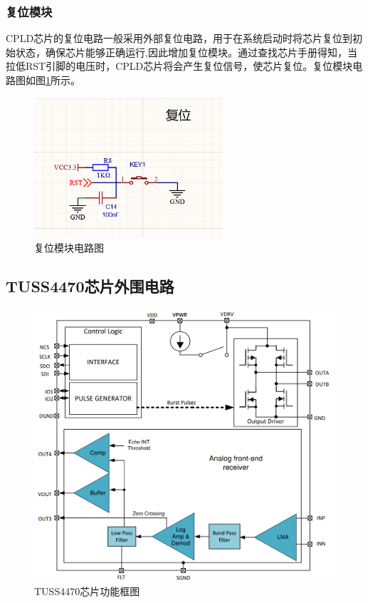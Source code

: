     \subsubsection{复位模块}
   CPLD芯片的复位电路一般采用外部复位电路，用于在系统启动时将芯片复位到初始状态，确保芯片能够正确运行,因此增加复位模块。通过查找芯片手册得知，当拉低RST引脚的电压时，CPLD芯片将会产生复位信号，使芯片复位。复位模块电路图如图\ref{复位模块电路图}所示。

    \begin{figure}[ht]
        \centering
        \includegraphics[width=7cm]{figure/reset circuit.png}
        \caption{复位模块电路图}
        \label{复位模块电路图}
    \end{figure}
    
    \newpage
    \subsection{TUSS4470芯片外围电路}
    
    
    \begin{figure}[ht]
		\centering
		\includegraphics[width=12cm]{figure/Function Block Diagram.png}
		\caption{TUSS4470芯片功能框图}
		\label{TUSS4470芯片功能框图}%
\end{figure}



